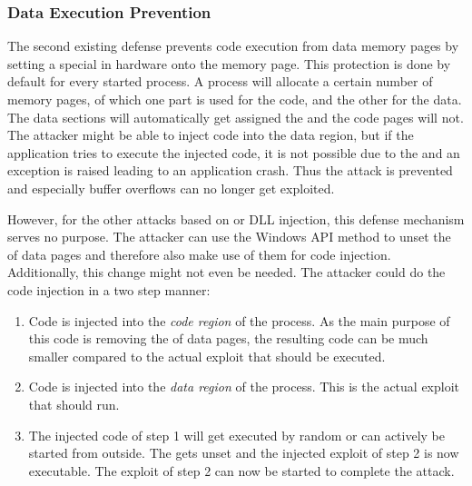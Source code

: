 \subsubsection{Data Execution Prevention}
\label{sec:dep}
The second existing defense prevents code execution from data memory pages by setting a special  \cite{msdn_dep} in hardware onto the memory page. This protection is done by default for every started process. A process will allocate a certain number of memory pages, of which one part is used for the code, and the other for the data. The data sections will automatically get assigned the  and the code pages will not. The attacker might be able to inject code into the data region, but if the application tries to execute the injected code, it is not possible due to the  and an exception is raised leading to an application crash. Thus the attack is prevented and especially buffer overflows can no longer get exploited.

However, for the other attacks based on  or DLL injection, this defense mechanism serves no purpose. The attacker can use the Windows \gls{API} method  \cite{msdn_virtualprotect} to unset the  of data pages and therefore also make use of them for code injection. Additionally, this change might not even be needed. The attacker could do the code injection in a two step manner: 
\begin{enumerate}
\item Code is injected into the \emph{code region} of the process. As the main purpose of this code is removing the  of data pages, the resulting code can be much smaller compared to the actual exploit that should be executed.
\item Code is injected into the \emph{data region} of the process. This is the actual exploit that should run.
\item The injected code of step 1 will get executed by random or can actively be started from outside. The  gets unset and the injected exploit of step 2 is now executable. The exploit of step 2 can now be started to complete the attack.
\end{enumerate}